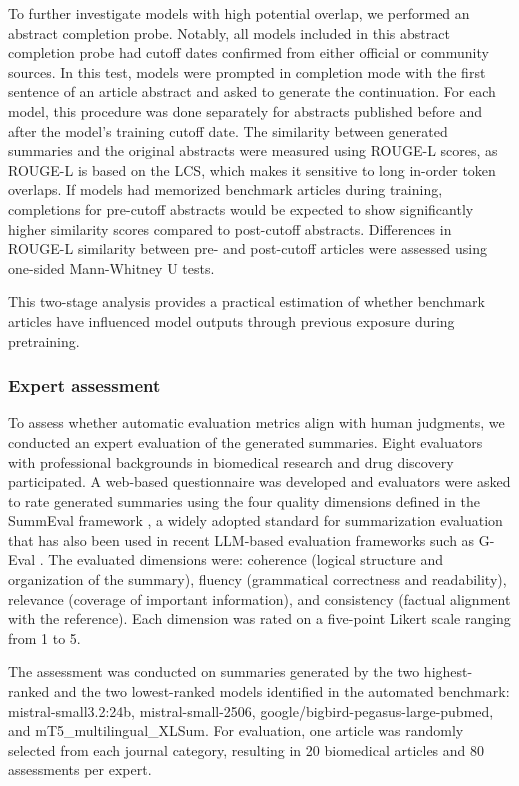 To further investigate models with high potential overlap, we performed an abstract completion probe. Notably, all models included in this abstract completion probe had cutoff dates confirmed from either official or community sources. In this test, models were prompted in completion mode with the first sentence of an article abstract and asked to generate the continuation. For each model, this procedure was done separately for abstracts published before and after the model’s training cutoff date. The similarity between generated summaries and the original abstracts were measured using \ac{ROUGE}-L scores, as \ac{ROUGE}-L is based on the \ac{LCS}, which makes it sensitive to long in-order token overlaps. If models had memorized benchmark articles during training, completions for pre-cutoff abstracts would be expected to show significantly higher similarity scores compared to post-cutoff abstracts. Differences in \ac{ROUGE}-L similarity between pre- and post-cutoff articles were assessed using one-sided Mann-Whitney U tests.

This two-stage analysis provides a practical estimation of whether benchmark articles have influenced model outputs through previous exposure during pretraining.

\subsubsection{Expert assessment}

To assess whether automatic evaluation metrics align with human judgments, we conducted an expert evaluation of the generated summaries. Eight evaluators with professional backgrounds in biomedical research and drug discovery participated. A web-based questionnaire was developed and evaluators were asked to rate generated summaries using the four quality dimensions defined in the SummEval framework \cite{fabbri2021summevalreevaluatingsummarizationevaluation}, a widely adopted standard for summarization evaluation that has also been used in recent \ac{LLM}-based evaluation frameworks such as G-Eval \cite{liu2023gevalnlgevaluationusing}. The evaluated dimensions were: coherence (logical structure and organization of the summary), fluency (grammatical correctness and readability), relevance (coverage of important information), and consistency (factual alignment with the reference). Each dimension was rated on a five-point Likert scale ranging from 1 to 5.

The assessment was conducted on summaries generated by the two highest-ranked and the two lowest-ranked models identified in the automated benchmark: mistral-small3.2:24b, mistral-small-2506, google/bigbird-pegasus-large-pubmed, and mT5\_multilingual\_XLSum. For evaluation, one article was randomly selected from each journal category, resulting in 20 biomedical articles and 80 assessments per expert.

